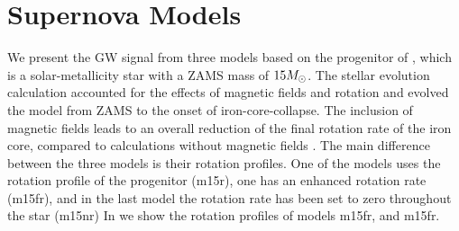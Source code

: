 \section{Supernova Models}
We present the GW signal from three models based on the progenitor of
\cite{heger_05}, which is a solar-metallicity star with a ZAMS mass of $15 {M_\odot}$.
The stellar evolution calculation accounted for the effects of magnetic fields and rotation and
evolved the model from ZAMS to the onset of iron-core-collapse. The inclusion of magnetic fields leads to an overall
reduction of the final rotation rate of the iron core, compared to calculations without magnetic
fields \citep{heger_05}. 
The main difference between the three models is their rotation profiles. One of the models
uses the rotation profile of the progenitor (m15r), one has an enhanced rotation rate (m15fr), 
and in the last model the rotation rate has been set to zero throughout the star (m15nr)
In  we show the rotation profiles of models m15fr, and m15fr.
